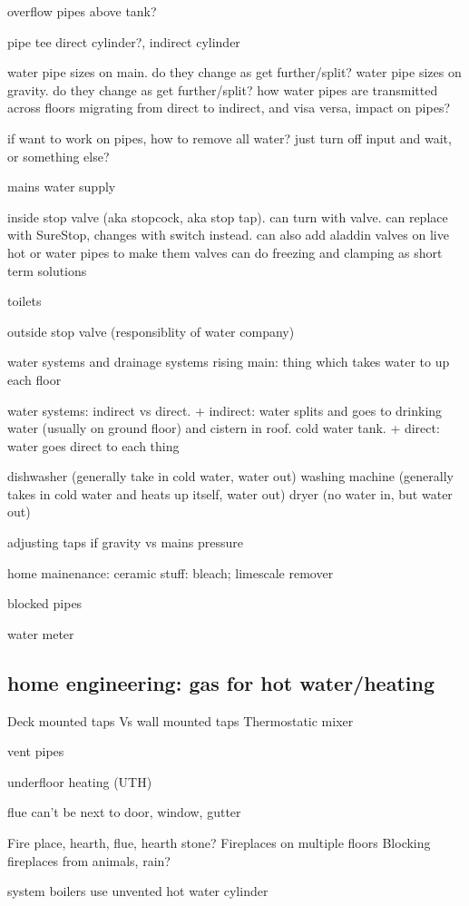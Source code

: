 overflow pipes above tank?

pipe tee
direct cylinder?, indirect cylinder

water pipe sizes on main. do they change as get further/split?
water pipe sizes on gravity. do they change as get further/split?
how water pipes are transmitted across floors
migrating from direct to indirect, and visa versa, impact on pipes?

if want to work on pipes, how to remove all water? just turn off input and wait, or something else?

mains water supply

inside stop valve (aka stopcock, aka stop tap). can turn with valve. can replace with SureStop, changes with switch instead.
can also add aladdin valves on live hot or water pipes to make them valves
can do freezing and clamping as short term solutions

toilets

outside stop valve (responsiblity of water company)

water systems and drainage systems
rising main: thing which takes water to up each floor

water systems: indirect vs direct.
+ indirect: water splits and goes to drinking water (usually on ground floor) and cistern in roof. cold water tank.
+ direct: water goes direct to each thing

dishwasher (generally take in cold water, water out)
washing machine (generally takes in cold water and heats up itself, water out)
dryer (no water in, but water out)

adjusting taps if gravity vs mains pressure

home mainenance:
ceramic stuff: bleach; limescale remover

blocked pipes

water meter
\subsection{home engineering: gas for hot water/heating}
Deck mounted taps Vs wall mounted taps
Thermostatic mixer

vent pipes

underfloor heating (UTH)

flue can't be next to door, window, gutter

Fire place, hearth, flue, hearth stone?
Fireplaces on multiple floors
Blocking fireplaces from animals, rain?


system boilers use unvented hot water cylinder

